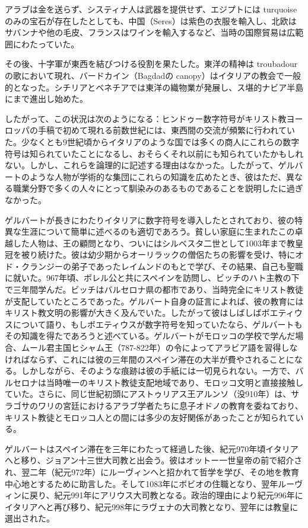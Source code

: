 \documentclass[a4paper,11pt,openany]{ltjsbook}
\begin{document}
アラブは金を送らず、システィナ人は武器を提供せず、エジプトには turquoiseのみの宝石が存在したとしても、中国（Seres）は紫色の衣服を輸入し、北欧はサバンナや他の毛皮、フランスはワインを輸入するなど、当時の国際貿易は広範囲にわたっていた。

その後、十字軍が東西を結びつける役割を果たした。東洋の精神は troubadour の歌において現れ、バードカイン（Bagdadの canopy）はイタリアの教会で一般的となった。シチリアとベネチアでは東洋の織物業が発展し、ス堪的ナビア半島にまで進出し始めた。

したがって、この状況は次のようになる：ヒンドゥー数字符号がキリスト教ヨーロッパの手稿で初めて現れる前数世紀には、東西間の交流が頻繁に行われていた。少なくとも9世紀頃からイタリアのような国では多くの商人にこれらの数字符号は知られていたことになるし、おそらくそれ以前にも知られていたかもしれない。しかし、これらを論理的に記述する理由はなかった。したがって、ゲルバートのような人物が学術的な集団にこれらの知識を広めたとき、彼はただ、異なる職業分野で多くの人々にとって馴染みのあるものであることを説明したに過ぎなかった。

ゲルバートが長きにわたりイタリアに数字符号を導入したとされており、彼の特異な生涯について簡単に述べるのも適切であろう。貧しい家庭に生まれたこの卓越した人物は、王の顧問となり、ついにはシルベスタ二世として1003年まで教皇冠を被り続けた。彼は幼少期からオーリラックの僧侶たちの影響を受け、特にオド・クランジーの弟子であったレイムンドのもとで学び、その結果、自己も聖職に就いた。967年頃、ボレル公と共にスペインを訪問し、ビッチのハト主教の下で三年間学んだ。ビッチはバルセロナ県の都市であり、当時完全にキリスト教徒が支配していたところであった。ゲルバート自身の証言によれば、彼の教育にはキリスト教文明の影響が大きく及んでいた。したがって彼はしばしばボエティウスについて語り、もしボエティウスが数字符号を知っていたなら、ゲルバートもその知識を得たであろうと述べている。ゲルバートがモロッコの学校で学んだ場合、ムール君主国ヒシャム王（787-822年）の令によってアラビア語を習得しなければならず、これには彼の三年間のスペイン滞在の大半が費やされることになる。しかしながら、そのような痕跡は彼の手紙には一切見られない。一方で、バルセロナは当時唯一のキリスト教徒支配地域であり、モロッコ文明と直接接触していた。さらに、同じ世紀初頭にアストゥリアス王アルンソ（没910年）は、サラゴサのワリの宮廷におけるアラブ学者たちに息子オドノの教育を委ねており、キリスト教徒とモロッコ人との間には多少の友好関係があったことが知られている。

ゲルバートはスペイン滞在を三年にわたって経過した後、紀元970年頃イタリアへと移り、ジョアン十三世大司教と出会う。彼はオットー一世皇帝の前で紹介され、翌二年（紀元972年）にルーヴィンへと招かれて哲学を学び、その地を教育中心地とするために助言した。そして1083年にボビオの住職となり、翌年ルーヴィンに戻り、紀元991年にアリウス大司教となる。政治的理由により紀元996年にイタリアへと再び移り、紀元998年にラヴェナの大司教となり、翌年には教皇に選出された。
\end{document}
